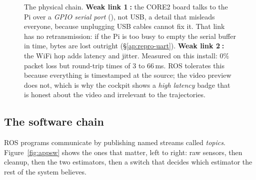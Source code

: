 \begin{figure}[htbp]
\caption{The physical chain. \textbf{Weak link \textcircled{\scriptsize 1}:}
the CORE2 board talks to the Pi over a \emph{GPIO serial port}
(), not USB, a detail that misleads everyone, because
unplugging USB cables cannot fix it. That link has no retransmission: if the
Pi is too busy to empty the serial buffer in time, bytes are lost outright
(\S\ref{ap:repro-uart}). \textbf{Weak link \textcircled{\scriptsize 2}:} the
WiFi hop adds latency and jitter. Measured on this install: $0\%$ packet loss
but round-trip times of $3$ to $66$\,ms. ROS tolerates this because
everything is timestamped at the source; the video preview does not, which is
why the cockpit shows a \emph{high latency} badge that is honest about the
video and irrelevant to the trajectories.}
\label{fig:apphw}
\end{figure}

\subsection{The software chain}
\label{ap:repro-sw}
ROS programs communicate by publishing named streams called \emph{topics}.
Figure~\ref{fig:appsw} shows the ones that matter, left to right: raw sensors,
then cleanup, then the two estimators, then a switch that decides which
estimator the rest of the system believes.

